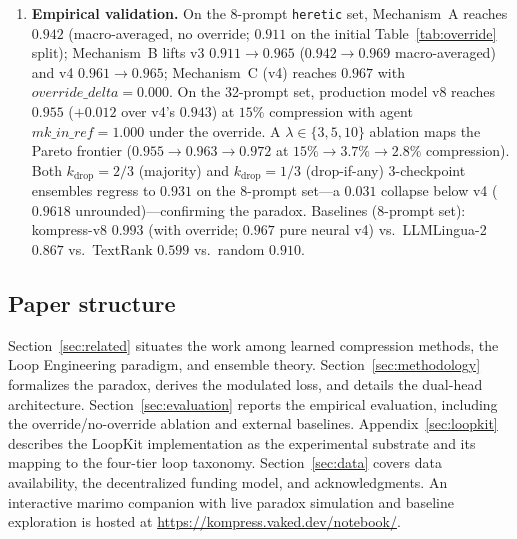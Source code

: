 \begin{enumerate}
        citation validity, and metric stability on every push. The agents
        follow a layered abstraction (\texttt{CIAgent} base class, registry,
        CLI + MCP interface) and are advisory by design---they report
        pass/fail but never block the shipping loop.
  \item \textbf{Empirical validation.} On the 8-prompt \texttt{heretic} set,
        Mechanism~A reaches $0.942$ (macro-averaged, no override; $0.911$ on
        the initial Table~\ref{tab:override} split); Mechanism~B lifts v3
        $0.911\to0.965$ ($0.942\to0.969$ macro-averaged) and v4
        $0.961\to0.965$; Mechanism~C (v4) reaches $0.967$ with
        $\mathit{override\_delta}{=}0.000$. On the 32-prompt set, production
        model v8 reaches $0.955$ ($+0.012$ over v4's $0.943$) at $15\%$
        compression with agent $\mathit{mk\_in\_ref}{=}1.000$ under the
        override. A $\lambda\in\{3,5,10\}$ ablation maps the Pareto frontier
        ($0.955\to0.963\to0.972$ at $15\%\to3.7\%\to2.8\%$ compression). Both
        $k_{\mathrm{drop}}{=}2/3$ (majority) and $k_{\mathrm{drop}}{=}1/3$
        (drop-if-any) 3-checkpoint ensembles regress to $0.931$ on the 8-prompt
        set---a $0.031$ collapse below v4 ($0.9618$ unrounded)---confirming the
        paradox. Baselines (8-prompt set): kompress-v8 $0.993$ (with override;
        $0.967$ pure neural v4) vs.\ LLMLingua-2 $0.867$ vs.\ TextRank $0.599$
        vs.\ random $0.910$.
\end{enumerate}

\subsection{Paper structure}

Section~\ref{sec:related} situates the work among learned compression methods,
the Loop Engineering paradigm, and ensemble theory.
Section~\ref{sec:methodology} formalizes the paradox, derives the modulated
loss, and details the dual-head architecture.
Section~\ref{sec:evaluation} reports the empirical evaluation, including the
override/no-override ablation and external baselines.
Appendix~\ref{sec:loopkit} describes the LoopKit implementation as the
experimental substrate and its mapping to the four-tier loop taxonomy.
Section~\ref{sec:data} covers data availability, the decentralized funding
model, and acknowledgments. An interactive marimo companion with live paradox
simulation and baseline exploration is hosted at
\url{https://kompress.vaked.dev/notebook/}.
